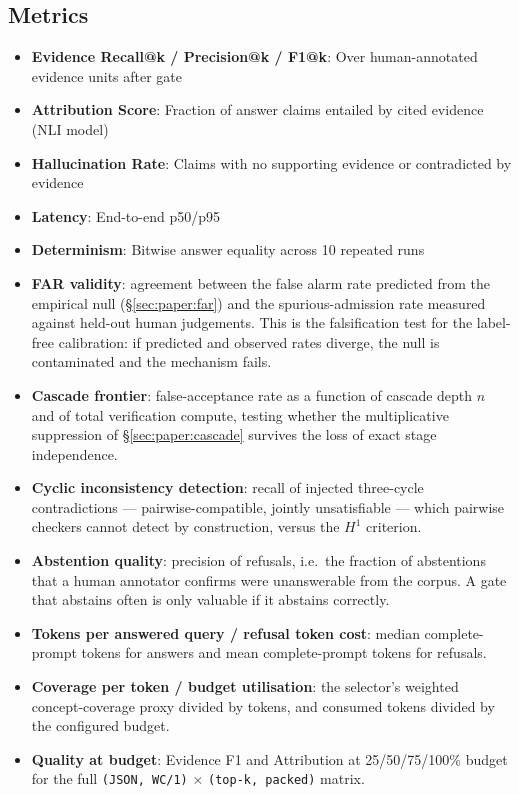 \subsection{Metrics}
\begin{itemize}
  \item \textbf{Evidence Recall@k / Precision@k / F1@k}: Over human-annotated evidence units after gate
  \item \textbf{Attribution Score}: Fraction of answer claims entailed by cited evidence (NLI model)
  \item \textbf{Hallucination Rate}: Claims with no supporting evidence or contradicted by evidence
  \item \textbf{Latency}: End-to-end p50/p95
  \item \textbf{Determinism}: Bitwise answer equality across 10 repeated runs
  \item \textbf{FAR validity}: agreement between the false alarm rate predicted from the empirical null (\S\ref{sec:paper:far}) and the spurious-admission rate measured against held-out human judgements. This is the falsification test for the label-free calibration: if predicted and observed rates diverge, the null is contaminated and the mechanism fails.
  \item \textbf{Cascade frontier}: false-acceptance rate as a function of cascade depth $n$ and of total verification compute, testing whether the multiplicative suppression of \S\ref{sec:paper:cascade} survives the loss of exact stage independence.
  \item \textbf{Cyclic inconsistency detection}: recall of injected three-cycle contradictions --- pairwise-compatible, jointly unsatisfiable --- which pairwise checkers cannot detect by construction, versus the $H^1$ criterion.
  \item \textbf{Abstention quality}: precision of refusals, i.e.\ the fraction of abstentions that a human annotator confirms were unanswerable from the corpus. A gate that abstains often is only valuable if it abstains correctly.
  \item \textbf{Tokens per answered query / refusal token cost}: median complete-prompt tokens for answers and mean complete-prompt tokens for refusals.
  \item \textbf{Coverage per token / budget utilisation}: the selector's weighted concept-coverage proxy divided by tokens, and consumed tokens divided by the configured budget.
  \item \textbf{Quality at budget}: Evidence F1 and Attribution at 25/50/75/100\% budget for the full \texttt{(JSON, WC/1)} $\times$ \texttt{(top-k, packed)} matrix.
\end{itemize}

